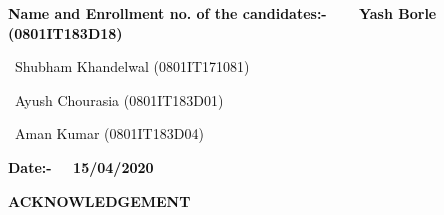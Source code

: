 \documentclass[12pt]{report}
\renewcommand{\_}{\kern-1.5pt\textunderscore\kern-1.5pt}
\begin{document}
\vspace{\baselineskip} \tabto{2.69in} 
\vspace{\baselineskip}\begin{adjustwidth}{0.2in}{0.84in}
\textbf{\textcolor[HTML]{0D0D0D}{Name and Enrollment no. of the candidates:-\ \ \ \  Yash Borle (0801IT183D18)}}\par

\end{adjustwidth}

\begin{adjustwidth}{3.0in}{0.84in}
\textcolor[HTML]{0D0D0D}{ \tabto{2.66in} \  Shubham Khandelwal (0801IT171081)}\par

\end{adjustwidth}

\begin{adjustwidth}{0.2in}{0.84in}
 \tabto{2.66in}  \tabto{2.93in} \tab \textcolor[HTML]{0D0D0D}{\tab \  Ayush Chourasia (0801IT183D01)}\par

\end{adjustwidth}

\begin{adjustwidth}{0.2in}{0.84in}
 \tabto{2.66in}  \tabto{2.93in} \tab \textcolor[HTML]{0D0D0D}{\tab \  Aman Kumar (0801IT183D04)}\par

\end{adjustwidth}


\vspace{\baselineskip}\begin{adjustwidth}{0.2in}{0.84in}
\textbf{\textcolor[HTML]{0D0D0D}{Date:-  \tabto{2.61in} \tab \  \tab \  15/04/2020}}\par

\end{adjustwidth}


\vspace{\baselineskip}

\vspace{\baselineskip}
\begin{adjustwidth}{0.2in}{0.84in}
\begin{Center}
{\fontsize{22pt}{26.4pt}\selectfont \textbf{\textcolor[HTML]{0D0D0D}{ACKNOWLEDGEMENT}}\par}
\end{Center}\par

\end{adjustwidth}
\end{document}
